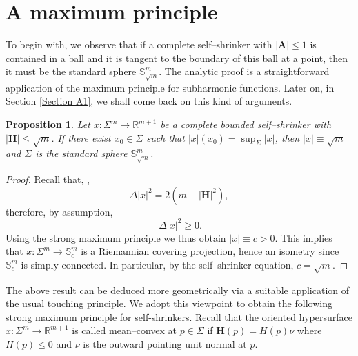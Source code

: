 \documentclass[11pt,leqno]{amsart}\usepackage{amsmath}
\newtheorem{proposition}[theorem]{Proposition}
\numberwithin{equation}{section}
\begin{document}
\section{A maximum principle} \label{Section maxprinc}

To begin with, we observe that if a complete self--shrinker with $|\mathbf{A}|\leq 1$ is contained in a ball and it is tangent to the boundary of this ball at a point, then it must be the standard sphere $\mathbb{S}^{m}_{\sqrt{m}}$. The analytic proof is a straightforward application of the maximum principle for subharmonic functions. Later on, in Section \ref{Section A1}, we shall come back on this kind of arguments.

\begin{proposition}\label{prop_maxprinc_sphere}
Let $x:\Sigma^m\to\mathbb{R}^{m+1}$ be a complete bounded self--shrinker with $|\mathbf{H}|\leq \sqrt{m}$. If there exist $x_0\in \Sigma$ such that $|x|(x_0)=\sup_{\Sigma}|x|$, then $|x|\equiv\sqrt{m}$ and $\Sigma$ is the standard sphere $\mathbb{S}^{m}_{\sqrt{m}}$.
\end{proposition}

\begin{proof}
Recall that, \cite{CoMi-Annals2012},
\begin{equation}\label{LaplNormImm}
\Delta|x|^{2}=2\left(  m-\left\vert \mathbf{H}\right\vert
^{2}\right)  ,
\end{equation}
therefore, by assumption,
\[
\ \Delta|x|^2\geq0.
\]
Using the strong maximum principle we thus obtain $|x|\equiv c>0$. This implies that $x:\Sigma^m \to \mathbb{S}^m_{c}$ is a Riemannian covering projection, hence an isometry since $\mathbb{S}^{m}_{c}$ is simply connected. In particular, by the self--shrinker equation, $c=\sqrt{m}$.
\end{proof}
The above result can be deduced more geometrically via a suitable application of the usual touching principle. We adopt this viewpoint to obtain the following strong maximum principle for self-shrinkers. Recall that the oriented hypersurface $x:\Sigma^m \rightarrow\mathbb{R}^{m+1}$ is called mean--convex at $p\in\Sigma$ if $\mathbf{H}(p)=H(p)\nu$ where $H(p)\leq0$ and $\nu$ is the outward pointing unit normal at $p$.
\end{document}

